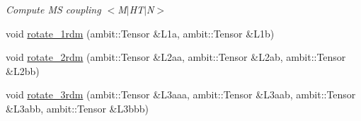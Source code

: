\begin{DoxyCompactItemize}
\begin{DoxyCompactList}\small\item\em Compute MS coupling $<$M$\vert$\+H\+T$\vert$N$>$ \end{DoxyCompactList}\item 
void \mbox{\hyperlink{classforte_1_1_d_s_r_g___m_r_p_t2_ac58de33a7bcba5b601e8d1cb627803c6}{rotate\+\_\+1rdm}} (ambit\+::\+Tensor \&L1a, ambit\+::\+Tensor \&L1b)
\item 
void \mbox{\hyperlink{classforte_1_1_d_s_r_g___m_r_p_t2_afb6995c283af9f99edbf819ea7359c1b}{rotate\+\_\+2rdm}} (ambit\+::\+Tensor \&L2aa, ambit\+::\+Tensor \&L2ab, ambit\+::\+Tensor \&L2bb)
\item 
void \mbox{\hyperlink{classforte_1_1_d_s_r_g___m_r_p_t2_a9b5fed7e984e823cbe4e5f5f443d4497}{rotate\+\_\+3rdm}} (ambit\+::\+Tensor \&L3aaa, ambit\+::\+Tensor \&L3aab, ambit\+::\+Tensor \&L3abb, ambit\+::\+Tensor \&L3bbb)
\end{DoxyCompactItemize}
